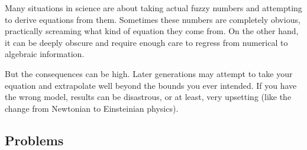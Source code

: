 
Many situations in science are about taking actual fuzzy numbers and attempting to
derive equations from them.    Sometimes these numbers are completely obvious,
practically screaming what kind of equation they come from.  On the other hand,
it can be deeply obscure and require enough care to regress from numerical
to algebraic information.  

But the consequences can be high.  Later generations may attempt to take your
equation and extrapolate well beyond the bounds you ever intended.  If you have
the wrong model, results can be disastrous, or at least, very upsetting (like the change
from Newtonian to Einsteinian physics).

\newpage
\chapterminitoc

\newpage
{}
\subsection{Problems}
\noindent{}
\newpage
